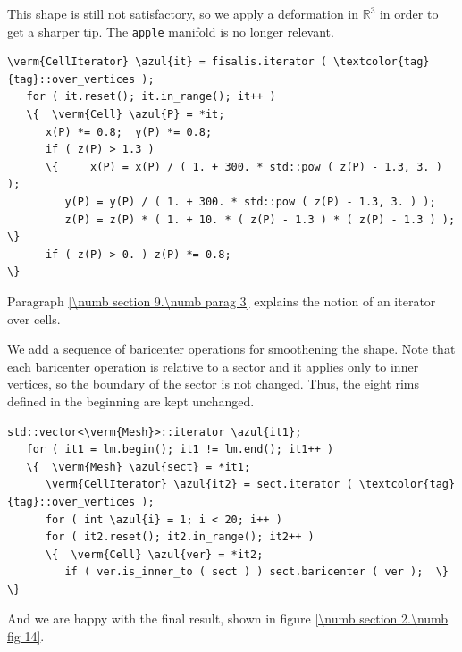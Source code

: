 This shape is still not satisfactory, so we apply a deformation in $ \mathbb{R}^3 $ in order to
get a sharper tip.
The {\small\tt apple} manifold is no longer relevant.

\begin{Verbatim}[commandchars=\\\{\},formatcom=\small\tt,frame=single,
   label=parag-\ref{\numb section 2.\numb parag 11}.cpp,rulecolor=\color{coment},
   baselinestretch=0.94,framesep=2mm]
   \verm{CellIterator} \azul{it} = fisalis.iterator ( \textcolor{tag}{tag}::over_vertices );
   for ( it.reset(); it.in_range(); it++ )
   \{  \verm{Cell} \azul{P} = *it;
      x(P) *= 0.8;  y(P) *= 0.8;
      if ( z(P) > 1.3 )
      \{	 x(P) = x(P) / ( 1. + 300. * std::pow ( z(P) - 1.3, 3. ) );
         y(P) = y(P) / ( 1. + 300. * std::pow ( z(P) - 1.3, 3. ) );
         z(P) = z(P) * ( 1. + 10. * ( z(P) - 1.3 ) * ( z(P) - 1.3 ) );  \}
      if ( z(P) > 0. ) z(P) *= 0.8;                                        \}
\end{Verbatim}

Paragraph \ref{\numb section 9.\numb parag 3} explains the notion of an iterator over cells.

We add a sequence of baricenter operations for smoothening the shape.
Note that each baricenter operation is relative to a sector and it applies only to inner
vertices, so the boundary of the sector is not changed.
Thus, the eight rims defined in the beginning are kept unchanged.

\begin{Verbatim}[commandchars=\\\{\},formatcom=\small\tt,frame=single,
   label=parag-\ref{\numb section 2.\numb parag 11}.cpp,rulecolor=\color{coment},
   baselinestretch=0.94,framesep=2mm]
   std::vector<\verm{Mesh}>::iterator \azul{it1};
   for ( it1 = lm.begin(); it1 != lm.end(); it1++ )
   \{  \verm{Mesh} \azul{sect} = *it1;
      \verm{CellIterator} \azul{it2} = sect.iterator ( \textcolor{tag}{tag}::over_vertices );
      for ( int \azul{i} = 1; i < 20; i++ )
      for ( it2.reset(); it2.in_range(); it2++ )
      \{  \verm{Cell} \azul{ver} = *it2;
         if ( ver.is_inner_to ( sect ) ) sect.baricenter ( ver );  \}                     \}
\end{Verbatim}

And we are happy with the final result, shown in figure \ref{\numb section 2.\numb fig 14}.

